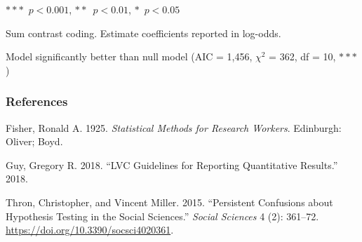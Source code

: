 \documentclass[
  10pt,
  letterpaper]{article}
\newlength{\cslhangindent}
\newlength{\cslentryspacingunit} %
\newenvironment{CSLReferences}[2] %
 {%
  \setlength{\parindent}{0pt}
  \ifodd #1
  \let\oldpar\par
  \def\par{\hangindent=\cslhangindent\oldpar}
  \fi
  \setlength{\parskip}{#2\cslentryspacingunit}
 }%
 {}
\begin{document}
\begin{table}[h]
\begin{center}
\begin{threeparttable}
\begin{tablenotes}
\item \hfill$\ast\ast\ast$~$p<0.001$,  $\ast\ast$~$p<0.01$, $\ast$~$p<0.05$\\[-10pt]
\item  Sum contrast coding. Estimate coefficients reported in log-odds.  
\item Model significantly better than null model (AIC = 1,456, $\chi^2$ = 362, df = 10, $\ast\ast\ast$)
\end{tablenotes}
\end{threeparttable}
\end{center}
\end{table} 

\hypertarget{references}{%
\subsubsection{References}\label{references}}

\hypertarget{refs}{}
\begin{CSLReferences}{1}{0}
\leavevmode{}%
Fisher, Ronald A. 1925. \emph{Statistical Methods for Research Workers}.
{E}dinburgh: Oliver; Boyd.

\leavevmode{}%
Guy, Gregory R. 2018. {``{LVC} Guidelines for Reporting Quantitative
Results.''} 2018.

\leavevmode{}%
Thron, Christopher, and Vincent Miller. 2015. {``Persistent Confusions
about Hypothesis Testing in the Social Sciences.''} \emph{Social
Sciences} 4 (2): 361--72. \url{https://doi.org/10.3390/socsci4020361}.

\end{CSLReferences}
\end{document}
